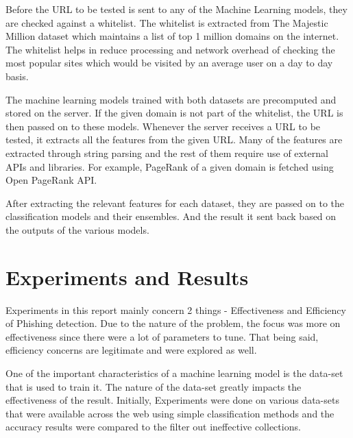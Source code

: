 \documentclass[conference]{IEEEtran}
\begin{document}
\par Before the URL to be tested is sent to any of the Machine Learning models, they are checked against a whitelist.
The whitelist is extracted from The Majestic Million dataset\cite{MajesticMillion} which maintains a list of top 1 million domains on the internet.
The whitelist helps in reduce processing and network overhead of checking the most popular sites which would be visited by an average user on a day to day basis.

\par The machine learning models trained with both datasets are precomputed and stored on the server.
If the given domain is not part of the whitelist, the URL is then passed on to these models.
Whenever the server receives a URL to be tested, it extracts all the features from the given URL.
Many of the features are extracted through string parsing and the rest of them require use of external APIs and libraries.
For example, PageRank of a given domain is fetched using Open PageRank API\cite{OpenPageRank}.

\par After extracting the relevant features for each dataset, they are passed on to the classification models and their ensembles. And the result it sent back based on the outputs of the various models.

\section{Experiments and Results}

Experiments in this report mainly concern 2 things - Effectiveness and Efficiency of Phishing detection. Due to the nature of the problem, the focus was more on effectiveness since there were a lot of parameters to tune. That being said, efficiency concerns are legitimate and were explored as well.

\par One of the important characteristics of a machine learning model is the data-set that is used to train it. The nature of the data-set greatly impacts the effectiveness of the result. Initially, Experiments were done on various data-sets that were available across the web using simple classification methods and the accuracy results were compared to the filter out ineffective collections. 
\end{document}
